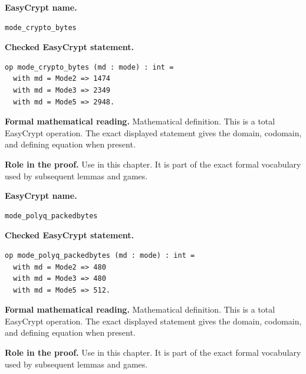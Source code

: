 \begin{formaldefinition}
\noindent\textbf{EasyCrypt name.}
\begin{lstlisting}[language=EasyCrypt,basicstyle=\ttfamily\scriptsize]
mode_crypto_bytes
\end{lstlisting}
\noindent\textbf{Checked EasyCrypt statement.}
\begin{lstlisting}[language=EasyCrypt,basicstyle=\ttfamily\scriptsize]
op mode_crypto_bytes (md : mode) : int =
  with md = Mode2 => 1474
  with md = Mode3 => 2349
  with md = Mode5 => 2948.
\end{lstlisting}
\noindent\textbf{Formal mathematical reading.}
Mathematical definition. This is a total EasyCrypt operation.  The exact displayed statement gives the domain, codomain, and defining equation when present.

\noindent\textbf{Role in the proof.}
Use in this chapter. It is part of the exact formal vocabulary used by subsequent lemmas and games.

\end{formaldefinition}

\begin{formaldefinition}
\noindent\textbf{EasyCrypt name.}
\begin{lstlisting}[language=EasyCrypt,basicstyle=\ttfamily\scriptsize]
mode_polyq_packedbytes
\end{lstlisting}
\noindent\textbf{Checked EasyCrypt statement.}
\begin{lstlisting}[language=EasyCrypt,basicstyle=\ttfamily\scriptsize]
op mode_polyq_packedbytes (md : mode) : int =
  with md = Mode2 => 480
  with md = Mode3 => 480
  with md = Mode5 => 512.
\end{lstlisting}
\noindent\textbf{Formal mathematical reading.}
Mathematical definition. This is a total EasyCrypt operation.  The exact displayed statement gives the domain, codomain, and defining equation when present.

\noindent\textbf{Role in the proof.}
Use in this chapter. It is part of the exact formal vocabulary used by subsequent lemmas and games.

\end{formaldefinition}

